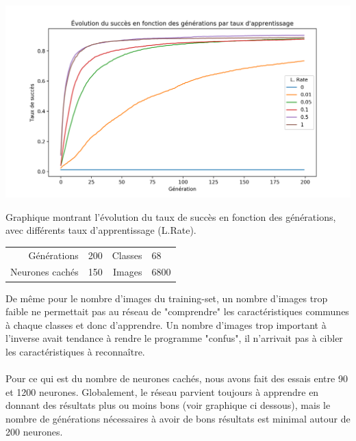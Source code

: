 \documentclass{article}
\begin{document}
\begin{center}
	\includegraphics[scale=0.25]{learningRateGraph.png}
	
	Graphique montrant l'évolution du taux de succès en fonction des générations, avec différents taux d'apprentissage (L.Rate).
	
	\begin{tabular}{r@{: }l r@{: }l}
		Générations & 200 & Classes & 68 \\
		Neurones cachés & 150 & Images & 6800 \\
	\end{tabular}
	
\end{center}

De même pour le nombre d’images du training-set, un nombre d’images trop faible ne permettait pas au réseau de "comprendre" les caractéristiques communes à chaque classes et donc d’apprendre. Un nombre d’images trop important à l’inverse avait tendance à rendre le programme "confus", il n’arrivait pas à cibler les caractéristiques à reconnaître.

\paragraph{}Pour ce qui est du nombre de neurones cachés, nous avons fait des essais entre 90 et 1200 neurones. Globalement, le réseau parvient toujours à apprendre en donnant des résultats plus ou moins bons (voir graphique ci dessous), mais le nombre de générations nécessaires à avoir de bons résultats est minimal autour de 200 neurones.
\end{document}
